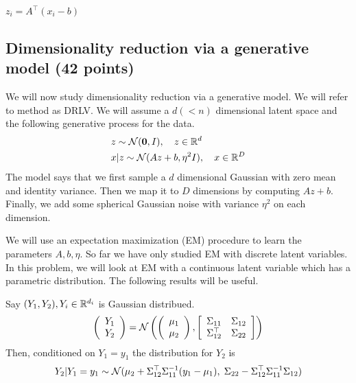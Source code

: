 \begin{enumerate}
\begin{soln}
  $z_i = A^\top (x_i - b)$
\end{soln}


\end{enumerate}


\subsection{Dimensionality reduction via a generative model (42 points)}

We will now study dimensionality reduction via a generative model.
We will refer to method as DRLV.
We will assume a $d (<n)$ dimensional latent space and
the following generative process for the data.
\begin{align*}
& z \sim \mathcal{N}({\bf 0}, I),  \quad  z\in \mathbb{R}^d \\
& x|z \sim \mathcal{N}(Az + b, \eta^2 I),  \quad  x\in \mathbb{R}^D 
\end{align*}
The model says that we first sample a $d$ dimensional Gaussian with zero mean
and identity variance. Then we map it to $D$ dimensions by computing $Az+b$.
Finally, we add some spherical Gaussian noise with variance $\eta^2$ on each
dimension.

We will use an expectation maximization (EM)
procedure to learn the parameters $A, b, \eta$. So far we have only studied
 EM with discrete latent variables. In this problem, we will look at
EM with a continuous latent variable which has a parametric distribution.
The following results will be useful.\\

\begin{fact}
Say $(Y_1, Y_2), Y_i \in \mathbb{R}^{d_i}$ is Gaussian distribued.
\[
\left(\begin{array}{c}Y_1 \\ Y_2\end{array}\right) =
\mathcal{N} \left( \left(\begin{array}{c} \mu_1 \\ \mu_2 \end{array} \right), 
\left[ \begin{array}{cc} \Sigma_{11} & \Sigma_{12} \\ \Sigma_{12}^\top &
  \Sigma_{22} \end{array} \right] 
  \right)
\]
Then, conditioned on $Y_1 = y_1$ the distribution for $Y_2$ is
\[
Y_2 | Y_1 = y_1 \sim \mathcal{N}(\mu_2+ \Sigma_{12}^\top \Sigma_{11}^{-1} (y_1 - \mu_1), \;
  \Sigma_{22} - \Sigma_{12}^\top \Sigma_{11}^{-1}\Sigma_{12} )
\]
\end{fact}

